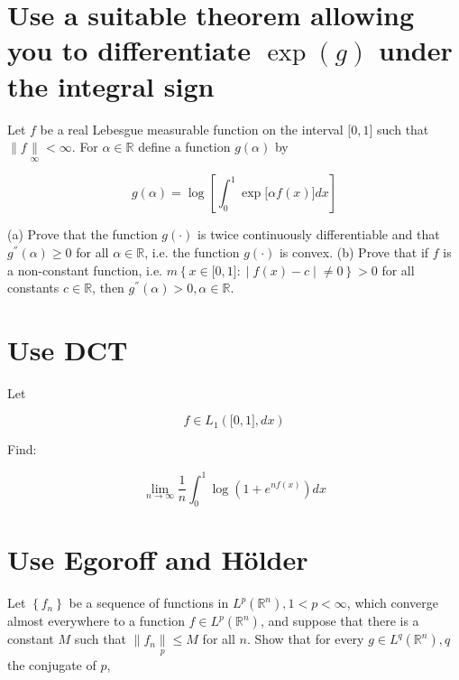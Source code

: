 \documentclass{qlnotes-export}
\begin{document}
\chapter{\texorpdfstring{Use a suitable theorem allowing you to differentiate \(\exp(g)\) under the integral sign}{Use a suitable theorem allowing you to differentiate \textbackslash exp(g) under the integral sign}}\label{use-a-suitable-theorem-allowing-you-to-differentiate-exp-g-under-the-integral-sign}

Let \(f\) be a real Lebesgue measurable function on the interval \(\lbrack 0,1\rbrack\) such that \(\parallel f\underset{\infty}{\parallel} < \infty\). For \(\alpha \in {\mathbb{R}}\) define a function \(g(\alpha)\) by

\[g(\alpha) = \log\left\lbrack {\int_{0}^{1}\exp\lbrack\alpha f(x)\rbrack dx} \right\rbrack\]



(a) Prove that the function \(g( \cdot )\) is twice continuously differentiable and that \(g^{''}(\alpha) \geq 0\) for all \(\alpha \in {\mathbb{R}}\), i.e. the function \(g( \cdot )\) is convex. (b) Prove that if \(f\) is a non-constant function, i.e. \(m\left\{ x \in \lbrack 0,1\rbrack: \middle| f(x) - c \middle| \neq 0 \right\} > 0\) for all constants \(c \in {\mathbb{R}}\), then \(g^{''}(\alpha) > 0,\alpha \in {\mathbb{R}}\).

\chapter{Use DCT}\label{use-dct}

Let

\[f \in L_{1}(\lbrack 0,1\rbrack,dx)\]

Find:

\[\lim\limits_{n\rightarrow\infty}\frac{1}{n}\int_{0}^{1}\log\left( {1 + e^{nf(x)}} \right)dx\]



\chapter{Use Egoroff and Hölder}\label{use-egoroff-and-huxf6lder}

Let \(\left\{ f_{n} \right\}\) be a sequence of functions in \(L^{p}\left( {\mathbb{R}}^{n} \right),1 < p < \infty\), which converge almost everywhere to a function \(f \in L^{p}\left( {\mathbb{R}}^{n} \right)\), and suppose that there is a constant \(M\) such that \(\parallel f_{n}\underset{p}{\parallel} \leq M\) for all \(n\). Show that for every \(g \in L^{q}\left( {\mathbb{R}}^{n} \right),q\) the conjugate of \(p\),
\end{document}
